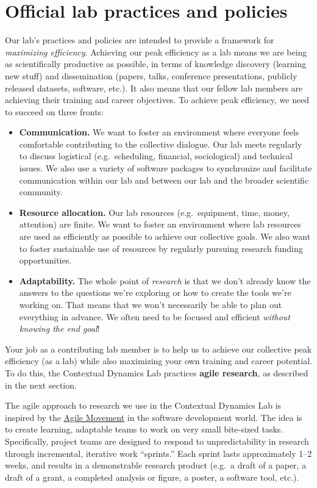 \documentclass{tufte-book} %
\begin{document}
\chapter{Official lab practices and policies}\label{ch:policy}
Our lab's practices and policies are intended to provide a framework
for \textit{maximizing efficiency}.  Achieving our peak efficiency as
a lab means we are being as scientifically productive as possible, in
terms of knowledge discovery (learning new stuff) and dissemination
(papers, talks, conference presentations, publicly released datasets,
software, etc.). It also means that our fellow lab members are
achieving their training and career objectives.  To achieve peak
efficiency, we need to succeed on three fronts:
\begin{itemize}
\item \textbf{Communication.}  We want to foster an environment where
  everyone feels comfortable contributing to the collective dialogue.
  Our lab meets regularly to discuss logistical (e.g.\ scheduling, financial,
  sociological) and technical issues.  We also use a variety of
  software packages to synchronize and facilitate communication within
  our lab and between our lab and the broader scientific community.
\item \textbf{Resource allocation.}  Our lab resources (e.g.\
  equipment, time, money, attention) are finite.  We want to foster an
  environment where lab resources are used as efficiently as possible
  to achieve our collective goals.  We also want to foster
  sustainable use of resources by regularly pursuing research funding opportunities.
\item \textbf{Adaptability.}  The whole point of \textit{research} is that we
  don't already know the answers to the questions we're exploring or
  how to create the tools we're working on.  That means that we won't
  necessarily be able to plan out everything in advance.  We often need to
  be focused and efficient \textit{without knowing the end goal}!
\end{itemize}
Your job as a contributing lab member is to help us to achieve our
collective peak efficiency (as a lab) while also maximizing your own
training and career potential.  To do this, the Contextual Dynamics
Lab practices \textbf{agile research}, as described in the next section.


\noindent The agile approach to research we use in the Contextual
Dynamics Lab is inspired by the
\href{http://scrumtrainingseries.com/}{Agile Movement} in the software
development world.  The idea is to create learning, adaptable teams to
work on very small bite-sized tasks.  Specifically, project teams are
designed to respond to unpredictability in research through
incremental, iterative work ``sprints.''  Each sprint lasts
approximately 1--2 weeks, and results in a demonstrable research
product (e.g.\ a draft of a paper, a draft of a grant, a completed
analysis or figure, a poster, a software tool, etc.).
\end{document}
